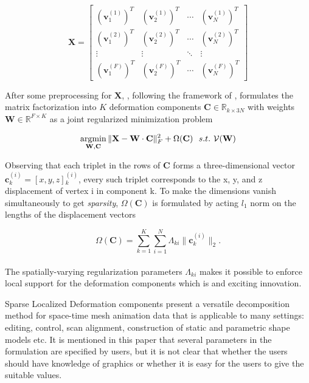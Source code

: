 \small{
\begin{equation}
 \label{eq:edgecotanoperator}
 \mathbf{X} = {\left[ \begin{array}{cccc}
 (\mathbf{v}{_1^{(1)}})^{T} & (\mathbf{v}{_2^{(1)}})^{T} & \cdots & (\mathbf{v}{_{N}^{(1)}})^{T}\\
 (\mathbf{v}{_1^{(2)}})^{T} & (\mathbf{v}{_2^{(2)}})^{T} & \cdots & (\mathbf{v}{_{N}^{(2)}})^{T}\\
 \vdots & \vdots & \ddots & \vdots\\
 (\mathbf{v}{_1^{(F)}})^{T} & (\mathbf{v}{_2^{(F)}})^{T} & \cdots & (\mathbf{v}{_{N}^{(F)}})^{T}
 \end{array}
 \right]}
\end{equation}
}

After some preprocessing for $\mathbf{X}$, \cite{neumann2013sparse},
following the framework of \cite{zou2006sparse},
formulates the matrix factorization into $K$ deformation components $\mathbf{C}\in \mathbb{R}_{k\times 3N}$ with weights
$\mathbf{W}\in \mathbb{R}^{F\times K}$ as a joint regularized minimization problem

\small{
\begin{equation}
 \label{eq:sparselocal}
 \mathop{\operatorname*{argmin}}_{\mathbf{W},\mathbf{C}}\|\mathbf{X}-\mathbf{W}\cdot\mathbf{C}\|{_{F}^2}+\Omega(\mathbf{C})~~s.t.~\mathcal{V}(\mathbf{W})
\end{equation}
}

Observing that each triplet in the rows of $\mathbf{C}$ forms a three-dimensional vector $\mathbf{c}{_{k}^{(i)}}=[x,y,z]{_{k}^{(i)}}$,
every such triplet corresponds to the x, y, and z displacement of vertex i in component k.
To make the dimensions vanish simultaneously to get \textit{sparsity}, $\Omega(\mathbf{C})$ is formulated by acting $l_1$ norm on the lengths of the displacement vectors

\small{
\begin{equation}
 \label{eq:sparselocal}
 \Omega(\mathbf{C})=\sum_{k=1}^{K}\sum_{i=1}^{N}\Lambda_{ki}\|\mathbf{c}{_{k}^{(i)}}\|_2.
\end{equation}
}
\\
The spatially-varying regularization parameters $\Lambda_{ki}$ makes it possible to enforce local support for the deformation components which is and exciting innovation.

Sparse Localized Deformation components present a versatile decomposition method for space-time mesh animation data that is applicable to many settings: editing, control, scan alignment, construction of static and parametric shape models etc.
It is mentioned in this paper that several parameters in the formulation are specified by users,
but it is not clear that whether the users should have knowledge of graphics or
whether it is easy for the users to give the suitable values.


